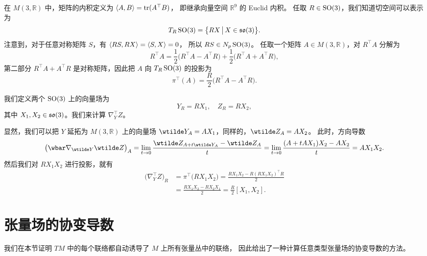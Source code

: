 \begin{example}[$\SO(3)$ 中的联络]\label{exa:connection on SO(3)}
  在 $M(3,\mathbb{R})$ 中，矩阵的内积定义为 $\left\langle A,B\right\rangle=\operatorname{tr}(A^\top B)$，
  即继承向量空间 $\mathbb{R}^9$ 的 Euclid 内积。
  任取 $R\in \operatorname{SO}(3)$，我们知道切空间可以表示为
  \[
    T_R\operatorname{SO}(3)=\big\{RX\,\big|\, X\in \mathfrak{so}(3)\big\}.
  \]
  注意到，对于任意对称矩阵 $S$，有 $\left\langle RS,RX\right\rangle=\left\langle S,X\right\rangle=0$，
  所以 $RS\in N_p\operatorname{SO}(3)$。
  任取一个矩阵 $A\in M(3,\mathbb{R})$，对 $R^\top A$ 分解为
  \[
    R^\top A=\frac{1}{2}\bigl(R^\top A-A^\top R\bigr)+\frac{1}{2}\bigl(R^\top A+A^\top R\bigr),
  \]
  第二部分 $R^\top A+A^\top R$ 是对称矩阵，因此把 $A$ 向 $T_R\operatorname{SO}(3)$ 的投影为
  \[
    \pi^\top(A)=\frac{R}{2}\bigl(R^\top A-A^\top R\bigr).
  \]

  我们定义两个 $\SO(3)$ 上的向量场为
  \[
    Y_R=RX_1,\quad Z_R=RX_2,
  \]
  其中 $X_1,X_2\in\mathfrak{so}(3)$。我们来计算 $\nabla_{Y}^\top Z$。

  显然，我们可以把 $Y$ 延拓为 $M(3,\mathbb{R})$ 上的向量场 $\wtilde Y_A=AX_1$，同样的，$\wtilde Z_A=AX_2$。
  此时，方向导数
  \[
    \bigl(\wbar\nabla_{\wtilde Y}\wtilde Z\bigr)_A=
    \lim_{t\to 0}\frac{\wtilde Z_{A+t\wtilde Y_A}-\wtilde Z_A}{t}=
    \lim_{t\to 0}\frac{(A+tAX_1)X_2-AX_2}{t}=AX_1X_2.
  \]
  然后我们对 $RX_1X_2$ 进行投影，就有
  \begin{align*}
    \bigl(\nabla_Y^\top Z\bigr)_R&=\pi^\top\bigl(RX_1X_2\bigr)=
    \frac{RX_1X_2-R(RX_1X_2)^\top R}{2}\\
    &=\frac{RX_1X_2-RX_2 X_1}{2}=\frac{R}{2}[X_1,X_2].
  \end{align*}
\end{example}



\section{张量场的协变导数}

我们在本节证明 $TM$ 中的每个联络都自动诱导了 $M$ 上所有张量丛中的联络，
因此给出了一种计算任意类型张量场的协变导数的方法。

